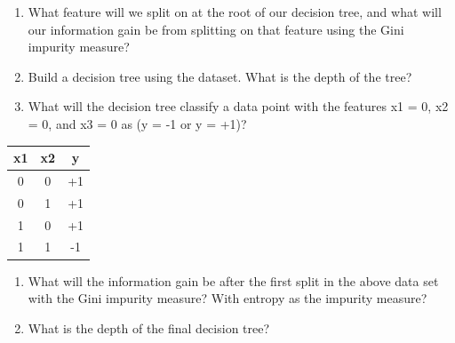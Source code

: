 \documentclass{article}
\begin{document}
\begin{enumerate}
    \item What feature will we split on at the root of our decision tree, and what will our information gain be from splitting on that feature using the Gini impurity measure?
    \item Build a decision tree using the dataset. What is the depth of the tree?
    \item What will the decision tree classify a data point with the features x1 = 0, x2 = 0, and x3 = 0 as (y = -1 or y = +1)?
    \end{enumerate}

\begin{center}
\begin{tabular}{ |c|c|c| } 
\hline
x1 & x2 & y \\
\hline
0 & 0 & +1\\ 
0 & 1 & +1\\ 
1 & 0 & +1\\ 
1 & 1 & -1\\ 
\hline
\end{tabular}
\end{center}
\begin{enumerate}[resume]
    \item What will the information gain be after the first split in the above data set with the Gini impurity measure? With entropy as the impurity measure?
    \item What is the depth of the final decision tree?
    
\end{enumerate}
\end{document}
